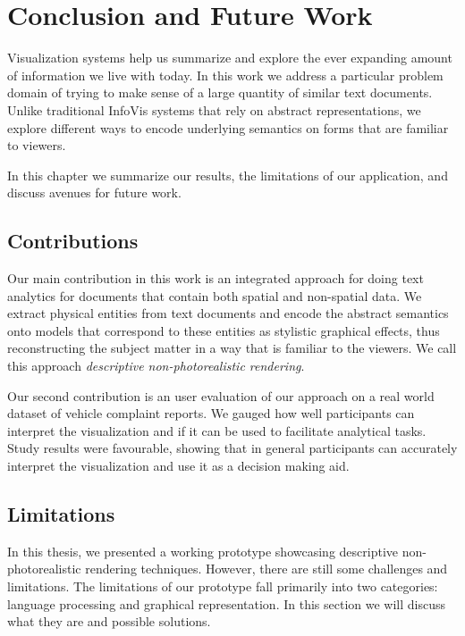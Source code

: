 \chapter{Conclusion and Future Work}
Visualization systems help us summarize and explore the ever expanding amount of
information we live with today. In this work we address a particular problem
domain of trying to make sense of a large quantity of similar text documents. Unlike
traditional InfoVis systems that rely on abstract representations, we explore different ways
to encode underlying semantics on \threed forms that are familiar to viewers. 

In this chapter we summarize our results, the limitations of our
application, and discuss avenues for future work.


\section{Contributions}
Our main contribution in this work is an integrated approach for doing text
analytics for documents that contain both spatial and non-spatial data. We extract
physical entities from text documents and encode the abstract semantics onto 
\threed models that correspond to these entities as stylistic graphical effects, thus 
reconstructing the subject matter in a way that is familiar to the viewers. We call
this approach \emph{descriptive non-photorealistic rendering}.

Our second contribution is an user evaluation of our approach on a real world dataset 
of vehicle complaint reports. We gauged how well participants can interpret the \threed 
visualization and if it can be used to facilitate analytical tasks. Study results were favourable, 
showing that in general participants can accurately interpret the visualization and use it as a
decision making aid. 




\section{Limitations}
In this thesis, we presented a working prototype showcasing descriptive
non-photorealistic rendering techniques. However, there are still some
challenges and limitations. The limitations of our prototype fall primarily into two
categories: language processing and graphical representation. In this section we
will discuss what they are and possible solutions.

